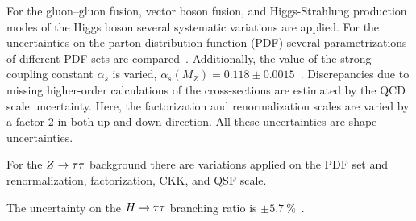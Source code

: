 \begin{description}[leftmargin=0cm]
    \item[Signal theory systmatics:] For the gluon--gluon fusion, vector boson fusion, and Higgs-Strahlung production
        modes of the Higgs boson several systematic variations are applied.
        For the uncertainties on the parton distribution function (PDF) several parametrizations of different PDF sets are compared~\cite{YR4}.
        Additionally, the value of the strong coupling constant $\alpha_s$ is varied, $\alpha_s(M_Z) = 0.118 \pm 0.0015$~\cite{YR4}.
        Discrepancies due to missing higher-order calculations of the cross-sections are estimated by the QCD scale uncertainty.
        Here, the factorization and renormalization scales are varied by a factor $2$ in both up and down direction.
        All these uncertainties are shape uncertainties.
    \item[$\mathbf{Z\tau\tau}$ theory systmatics:] For the $Z \to \tau \tau$ background there are variations applied on the PDF set and
        renormalization, factorization, CKK, and QSF scale.
    \item[$\mathbf{\Htt}$ branching ratio:] The uncertainty on the $H \to \tau \tau$ branching ratio is $\pm \SI{5.7}{\percent}$~\cite{YR3}.
\end{description}


